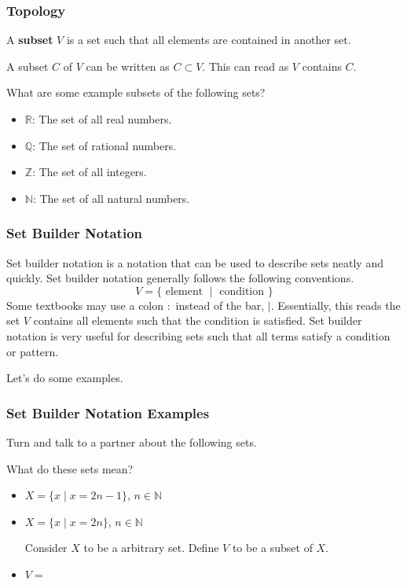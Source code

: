 \documentclass[9pt]{beamer}
\newcommand*{\fullchili}{\textcolor{red}{\faPepperHot}}
\newcommand*{\emptychili}{\textcolor{white}{\contour{red}{\faPepperHot}}}
\begin{document}
\begin{frame}
    \frametitle{Topology  ~ \emptychili \emptychili \emptychili \emptychili}
    \bigskip
    A \textbf{subset} $V$ is a set such that all elements are contained in another set. \bigskip

    \bigskip 
    A subset $C$ of $V$ can be written as $C \subset V$. This can read as $V$ contains $C$.

    What are some example subsets of the following sets?
    \bigskip
    \begin{itemize} 
        \item $\mathbb{R}$: The set of all real numbers. 

        \item $\mathbb{Q}$: The set of rational numbers. 

        \item $\mathbb{Z}$: The set of all integers. 

        \item $\mathbb{N}$: The set of all natural numbers.
    \end{itemize}
\end{frame}

\begin{frame}
\frametitle{Set Builder Notation ~ \fullchili \fullchili \emptychili \emptychili}
    Set builder notation is a notation that can be used to describe sets neatly and quickly. 
    Set builder notation generally follows the following conventions. 
    \[
        V = \{\text{ element } \mid \text{ condition } \} 
    \] 
    Some textbooks may use a colon $:$ instead of the bar, $\mid$. Essentially, this reads the set $V$ contains all elements such that the condition is satisfied. Set builder notation is very useful for describing sets such that all terms satisfy a condition or pattern. 
   
    Let's do some examples. 
\end{frame}
\begin{frame}
    \frametitle{Set Builder Notation Examples ~ \fullchili \fullchili \fullchili \emptychili}
    
    Turn and talk to a partner about the following sets. 

    What do these sets mean?

    \begin{itemize}
        \item $X = \{x \mid x = 2n - 1 \}$, $n \in \mathbb{N}$ 

        \item $X = \{x \mid x = 2n \}$, $n \in \mathbb{N}$ 

        Consider $X$ to be a arbitrary set. Define $V$ to be a subset of $X$.  
        
    \item $ V = $
    \end{itemize}
    
\end{frame}
\end{document}
